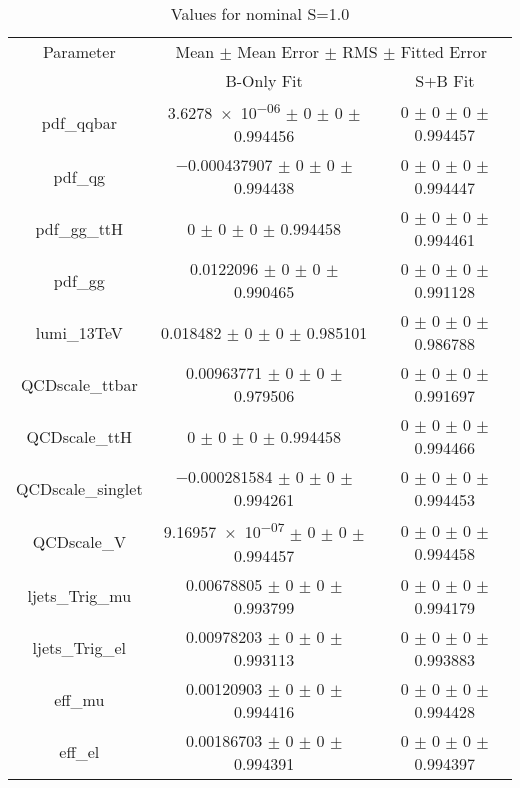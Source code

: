 \begin{table}
\centering
\caption{Values for nominal S=1.0}
\begin{tabular}{ccc}
\toprule
Parameter & \multicolumn{2}{c}{Mean $\pm$ Mean Error $\pm$ RMS $\pm$ Fitted Error}\\
 & B-Only Fit & S+B Fit\\
\midrule
pdf\_qqbar & \num{3.6278e-06} $\pm$ \num{0} $\pm$ \num{0} $\pm$ \num{0.994456} & \num{0} $\pm$ \num{0} $\pm$ \num{0} $\pm$ \num{0.994457}\\
pdf\_qg & \num{-0.000437907} $\pm$ \num{0} $\pm$ \num{0} $\pm$ \num{0.994438} & \num{0} $\pm$ \num{0} $\pm$ \num{0} $\pm$ \num{0.994447}\\
pdf\_gg\_ttH & \num{0} $\pm$ \num{0} $\pm$ \num{0} $\pm$ \num{0.994458} & \num{0} $\pm$ \num{0} $\pm$ \num{0} $\pm$ \num{0.994461}\\
pdf\_gg & \num{0.0122096} $\pm$ \num{0} $\pm$ \num{0} $\pm$ \num{0.990465} & \num{0} $\pm$ \num{0} $\pm$ \num{0} $\pm$ \num{0.991128}\\
lumi\_13TeV & \num{0.018482} $\pm$ \num{0} $\pm$ \num{0} $\pm$ \num{0.985101} & \num{0} $\pm$ \num{0} $\pm$ \num{0} $\pm$ \num{0.986788}\\
QCDscale\_ttbar & \num{0.00963771} $\pm$ \num{0} $\pm$ \num{0} $\pm$ \num{0.979506} & \num{0} $\pm$ \num{0} $\pm$ \num{0} $\pm$ \num{0.991697}\\
QCDscale\_ttH & \num{0} $\pm$ \num{0} $\pm$ \num{0} $\pm$ \num{0.994458} & \num{0} $\pm$ \num{0} $\pm$ \num{0} $\pm$ \num{0.994466}\\
QCDscale\_singlet & \num{-0.000281584} $\pm$ \num{0} $\pm$ \num{0} $\pm$ \num{0.994261} & \num{0} $\pm$ \num{0} $\pm$ \num{0} $\pm$ \num{0.994453}\\
QCDscale\_V & \num{9.16957e-07} $\pm$ \num{0} $\pm$ \num{0} $\pm$ \num{0.994457} & \num{0} $\pm$ \num{0} $\pm$ \num{0} $\pm$ \num{0.994458}\\
ljets\_Trig\_mu & \num{0.00678805} $\pm$ \num{0} $\pm$ \num{0} $\pm$ \num{0.993799} & \num{0} $\pm$ \num{0} $\pm$ \num{0} $\pm$ \num{0.994179}\\
ljets\_Trig\_el & \num{0.00978203} $\pm$ \num{0} $\pm$ \num{0} $\pm$ \num{0.993113} & \num{0} $\pm$ \num{0} $\pm$ \num{0} $\pm$ \num{0.993883}\\
eff\_mu & \num{0.00120903} $\pm$ \num{0} $\pm$ \num{0} $\pm$ \num{0.994416} & \num{0} $\pm$ \num{0} $\pm$ \num{0} $\pm$ \num{0.994428}\\
eff\_el & \num{0.00186703} $\pm$ \num{0} $\pm$ \num{0} $\pm$ \num{0.994391} & \num{0} $\pm$ \num{0} $\pm$ \num{0} $\pm$ \num{0.994397}\\

\end{tabular}
\end{table}
